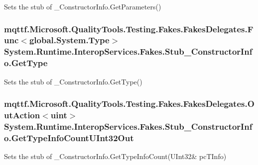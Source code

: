 Sets the stub of \-\_\-\-Constructor\-Info.\-Get\-Parameters()

\hypertarget{class_system_1_1_runtime_1_1_interop_services_1_1_fakes_1_1_stub___constructor_info_a6c32ec97e559efae2794324247402f4e}{
\subsubsection[{Get\-Type}]{\setlength{\rightskip}{0pt plus 5cm}mqttf.\-Microsoft.\-Quality\-Tools.\-Testing.\-Fakes.\-Fakes\-Delegates.\-Func$<$global.\-System.\-Type$>$ System.\-Runtime.\-Interop\-Services.\-Fakes.\-Stub\-\_\-\-Constructor\-Info.\-Get\-Type}}\label{class_system_1_1_runtime_1_1_interop_services_1_1_fakes_1_1_stub___constructor_info_a6c32ec97e559efae2794324247402f4e}


Sets the stub of \-\_\-\-Constructor\-Info.\-Get\-Type()

\hypertarget{class_system_1_1_runtime_1_1_interop_services_1_1_fakes_1_1_stub___constructor_info_a26304d7eefe97235c0998e14fcbbc7e7}{
\subsubsection[{Get\-Type\-Info\-Count\-U\-Int32\-Out}]{\setlength{\rightskip}{0pt plus 5cm}mqttf.\-Microsoft.\-Quality\-Tools.\-Testing.\-Fakes.\-Fakes\-Delegates.\-Out\-Action$<$uint$>$ System.\-Runtime.\-Interop\-Services.\-Fakes.\-Stub\-\_\-\-Constructor\-Info.\-Get\-Type\-Info\-Count\-U\-Int32\-Out}}\label{class_system_1_1_runtime_1_1_interop_services_1_1_fakes_1_1_stub___constructor_info_a26304d7eefe97235c0998e14fcbbc7e7}


Sets the stub of \-\_\-\-Constructor\-Info.\-Get\-Type\-Info\-Count(U\-Int32\& pc\-T\-Info)

